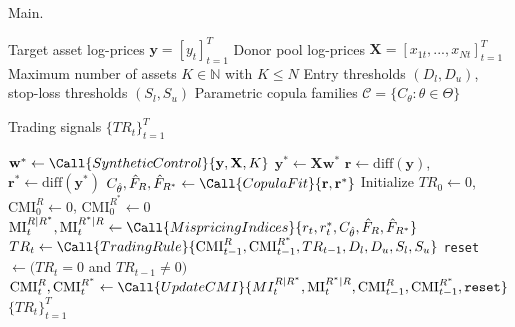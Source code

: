 \begin{algorithm}[H]
\caption{Main. }
\label{alg:mi_pairs_trading}
\begin{algorithmic}[1]
\Require
    \State Target asset log-prices $\mathbf{y} = [y_t]_{t=1}^T$
    \State Donor pool log-prices $\mathbf{X} = [x_{1t}, ..., x_{Nt}]_{t=1}^T$
    \State Maximum number of assets $K \in \mathbb{N}$ with $K \leq N$
    \State Entry thresholds $(D_l, D_u)$, stop-loss thresholds $(S_l, S_u)$
    \State Parametric copula families $\mathcal{C} = \{C_\theta : \theta \in \Theta\}$
    

\Ensure Trading signals $\{TR_t\}_{t=1}^T$

\Statex
{}
    \State $\mathbf{w}^* \gets \Call{SyntheticControl}{\mathbf{y}, \mathbf{X}, K}$
    \Comment{\scalebox{0.9}{\textcolor{Grey_color}{Construct synthetic asset}}}
    \State $\mathbf{y}^* \gets \mathbf{X}\mathbf{w}^*$
    \State $\mathbf{r} \gets \text{diff}(\mathbf{y})$, $\mathbf{r}^* \gets \text{diff}(\mathbf{y}^*)$  
    \Comment{\scalebox{0.9}{\textcolor{Grey_color}{Compute returns}}} 
    \State $C_{\hat{\theta}}, \hat{F}_R, \hat{F}_{R^*} \gets \Call{CopulaFit}{\mathbf{r}, \mathbf{r}^*}$  
    \Comment{\scalebox{0.9}{\textcolor{Grey_color}{Fit copula}}} 
    \State Initialize $TR_0 \gets 0$, $\text{CMI}_0^R \gets 0$, $\text{CMI}_0^{R^*} \gets 0$
        \State $\text{MI}_t^{R|R^*}, \text{MI}_t^{R^*|R} \gets \Call{MispricingIndices}{r_t, r_t^*, C_{\hat{\theta}}, \hat{F}_R, \hat{F}_{R^*}}$
        \State $TR_t \gets \Call{TradingRule}{\text{CMI}_{t-1}^R, \text{CMI}_{t-1}^{R^*}, TR_{t-1}, D_l, D_u, S_l, S_u}$
        \State \texttt{reset} $\gets (TR_t = 0$ and $TR_{t-1} \neq 0)$  
    \Comment{\scalebox{0.9}{\textcolor{Grey_color}{Reset CMI if position closed}}} 
        \State $\text{CMI}_t^R, \text{CMI}_t^{R^*} \gets \Call{UpdateCMI}{MI_t^{R|R^*}, \text{MI}_t^{R^*|R}, \text{CMI}_{t-1}^R, \text{CMI}_{t-1}^{R^*}, \texttt{reset}}$
    \EndFor
    \State \Return $\{TR_t\}_{t=1}^T$
\EndProcedure
\end{algorithmic}
\end{algorithm}